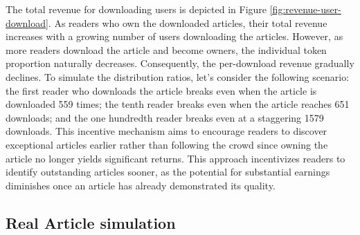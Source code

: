 \documentclass[lettersize,journal]{IEEEtran}
\begin{document}
The total revenue for downloading users is depicted in Figure \ref{fig:revenue-user-download}. As readers who own the downloaded articles, their total revenue increases with a growing number of users downloading the articles. However, as more readers download the article and become owners, the individual token proportion naturally decreases. Consequently, the per-download revenue gradually declines.
To simulate the distribution ratios, let's consider the following scenario: the first reader who downloads the article breaks even when the article is downloaded 559 times; the tenth reader breaks even when the article reaches 651 downloads; and the one hundredth reader breaks even at a staggering 1579 downloads. This incentive mechanism aims to encourage readers to discover exceptional articles earlier rather than following the crowd since owning the article no longer yields significant returns.
This approach incentivizes readers to identify outstanding articles sooner, as the potential for substantial earnings diminishes once an article has already demonstrated its quality.


\subsection{Real Article simulation}
\end{document}
